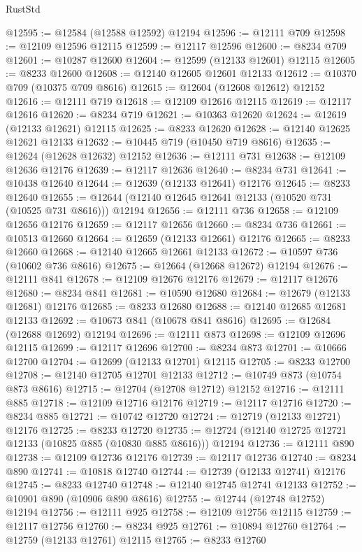 \begin{lexlean}{RustStd}
\begin{coremodule}
@12595 := @12584 (@12588 @12592) @12194
@12596 := @12111 @709
@12598 := @12109 @12596 @12115
@12599 := @12117 @12596
@12600 := @8234 @709
@12601 := @10287 @12600
@12604 := @12599 (@12133 @12601) @12115
@12605 := @8233 @12600
@12608 := @12140 @12605 @12601 @12133
@12612 := @10370 @709 (@10375 @709 @8616)
@12615 := @12604 (@12608 @12612) @12152
@12616 := @12111 @719
@12618 := @12109 @12616 @12115
@12619 := @12117 @12616
@12620 := @8234 @719
@12621 := @10363 @12620
@12624 := @12619 (@12133 @12621) @12115
@12625 := @8233 @12620
@12628 := @12140 @12625 @12621 @12133
@12632 := @10445 @719 (@10450 @719 @8616)
@12635 := @12624 (@12628 @12632) @12152
@12636 := @12111 @731
@12638 := @12109 @12636 @12176
@12639 := @12117 @12636
@12640 := @8234 @731
@12641 := @10438 @12640
@12644 := @12639 (@12133 @12641) @12176
@12645 := @8233 @12640
@12655 := @12644 (@12140 @12645 @12641 @12133 (@10520 @731 (@10525 @731 @8616))) @12194
@12656 := @12111 @736
@12658 := @12109 @12656 @12176
@12659 := @12117 @12656
@12660 := @8234 @736
@12661 := @10513 @12660
@12664 := @12659 (@12133 @12661) @12176
@12665 := @8233 @12660
@12668 := @12140 @12665 @12661 @12133
@12672 := @10597 @736 (@10602 @736 @8616)
@12675 := @12664 (@12668 @12672) @12194
@12676 := @12111 @841
@12678 := @12109 @12676 @12176
@12679 := @12117 @12676
@12680 := @8234 @841
@12681 := @10590 @12680
@12684 := @12679 (@12133 @12681) @12176
@12685 := @8233 @12680
@12688 := @12140 @12685 @12681 @12133
@12692 := @10673 @841 (@10678 @841 @8616)
@12695 := @12684 (@12688 @12692) @12194
@12696 := @12111 @873
@12698 := @12109 @12696 @12115
@12699 := @12117 @12696
@12700 := @8234 @873
@12701 := @10666 @12700
@12704 := @12699 (@12133 @12701) @12115
@12705 := @8233 @12700
@12708 := @12140 @12705 @12701 @12133
@12712 := @10749 @873 (@10754 @873 @8616)
@12715 := @12704 (@12708 @12712) @12152
@12716 := @12111 @885
@12718 := @12109 @12716 @12176
@12719 := @12117 @12716
@12720 := @8234 @885
@12721 := @10742 @12720
@12724 := @12719 (@12133 @12721) @12176
@12725 := @8233 @12720
@12735 := @12724 (@12140 @12725 @12721 @12133 (@10825 @885 (@10830 @885 @8616))) @12194
@12736 := @12111 @890
@12738 := @12109 @12736 @12176
@12739 := @12117 @12736
@12740 := @8234 @890
@12741 := @10818 @12740
@12744 := @12739 (@12133 @12741) @12176
@12745 := @8233 @12740
@12748 := @12140 @12745 @12741 @12133
@12752 := @10901 @890 (@10906 @890 @8616)
@12755 := @12744 (@12748 @12752) @12194
@12756 := @12111 @925
@12758 := @12109 @12756 @12115
@12759 := @12117 @12756
@12760 := @8234 @925
@12761 := @10894 @12760
@12764 := @12759 (@12133 @12761) @12115
@12765 := @8233 @12760

\end{coremodule}
\end{lexlean}
